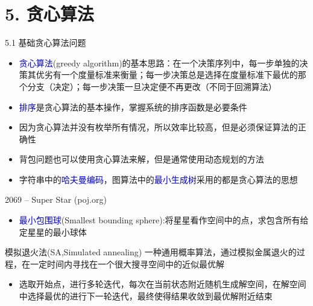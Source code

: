 


\frame{\titlepage}
\section{5. 贪心算法}
\begin{frame}{5.1 基础贪心算法问题}
    \begin{itemize}
        \item \textcolor{blue}{贪心算法}(greedy algorithm)的基本思路：在一个决策序列中，每一步单独的决策其优劣有一个度量标准来衡量；每一步决策总是选择在度量标准下最优的那个分支（决定）；每一步决策一旦决定便不再更改（不同于回溯算法）
        \item \textcolor{blue}{排序}是贪心算法的基本操作，掌握系统的排序函数是必要条件
        \item 因为贪心算法并没有枚举所有情况，所以效率比较高，但是必须保证算法的正确性
        \item 背包问题也可以使用贪心算法来解，但是通常使用动态规划的方法
        \item 字符串中的\textcolor{blue}{哈夫曼编码}，图算法中的\textcolor{blue}{最小生成树}采用的都是贪心算法的思想
    \end{itemize}
\end{frame}
\begin{frame}{2069 -- Super Star (poj.org)}
    \begin{itemize}
        \item \textcolor{blue}{最小包围球}(Smallest bounding sphere):将星星看作空间中的点，求包含所有给定星星的最小球体
        \begin{center}
        \end{center}
    \end{itemize}
    \begin{block}{模拟退火法(SA,Simulated annealing)}
        \quad 一种通用概率算法，通过模拟金属退火的过程，在一定时间内寻找在一个很大搜寻空间中的近似最优解
    \end{block}
    \begin{itemize}
        \item 选取开始点，进行多轮迭代，每次在当前状态附近随机生成解空间，在解空间中选择最优的进行下一轮迭代，最终使得结果收敛到最优解附近结束
    \end{itemize}
\end{frame}
